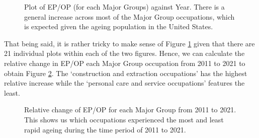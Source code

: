 \documentclass[11pt]{article}
\begin{document}
\begin{figure}[!htb]
	\centering
	\hfill
	\hfill
	\caption{Plot of EP/OP (for each Major Groups) against Year. There is a general increase across most of the Major Group occupations, which is expected given the ageing population in the United States.}
	\label{fig:EP/OP against year}
\end{figure}

That being said, it is rather tricky to make sense of Figure \ref{fig:EP/OP against year} given that there are 21 individual plots within each of the two figures. Hence, we can calculate the relative change in EP/OP each Major Group occupation from 2011 to 2021 to obtain Figure \ref{fig:relativechange}. The `construction and extraction occupations' has the highest relative increase while the `personal care and service occupations' features the least.


\begin{figure}[!htb]
	\centering
	\hfill
	\hfill
	\caption{Relative change of EP/OP for each Major Group from 2011 to 2021. This shows us which occupations experienced the most and least rapid ageing during the time period of 2011 to 2021.}
	\label{fig:relativechange}
\end{figure}



\newpage
\end{document}
